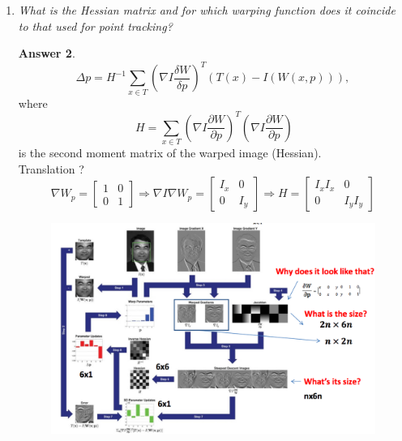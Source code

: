 \documentclass[a4paper,12 pt]{article}
\theoremstyle{definition}
\theoremstyle{remark}
\theoremstyle{definition}
\theoremstyle{definition}
\theoremstyle{definition}
\theoremstyle{definition}
\theoremstyle{remark}
\theoremstyle{remark}
\theoremstyle{definition}
\theoremstyle{definition}
\newtheorem*{answer}{Answer}
\begin{document}
\begin{enumerate}
\begin{enumerate}
\begin{answer}
\begin{equation}
I(W(x,p+\Delta p))\approx I(W(x,p))+ \underbrace{\nabla I}_{\text{image gradient}} \underbrace{\frac{\partial W}{\partial p}}_{\text{Jabobianof the warp}}\Delta p.
\end{equation}
The image gradient $\nabla l=[I_x,I_y]$ is evaluated at W(x,p). By replacing that in the equation we get
\begin{equation}
E=\sum_{x\in T}\left[ I(W(x,p))+ \nabla I \frac{\partial W}{\partial p}\Delta p-T(x)\right]^2.
\end{equation}
In order to minimize it, we differentiate and equate to 0, i.e.
\begin{equation}
\frac{\partial E}{\partial \Delta p}=0.
\end{equation}
\end{answer}
\item \textit{What is the Hessian matrix and for which warping function does it coincide to that used for point tracking?}
\begin{answer}
\begin{equation}
\Delta p=H^{-1}\sum_{x\in T}\left( \nabla I \frac{\delta W}{\delta p}\right)^T(T(x)-I(W(x,p))),
\end{equation}
where
\begin{equation}
\ H=\sum_{x\in T}\left( \nabla I \frac{\partial W}{\partial p}\right)^T \left( \nabla I \frac{\partial W}{\partial p}\right)
\end{equation}
is the second moment matrix of the warped image (Hessian).\\
Translation ?
\begin{equation}
\nabla W_p = \begin{bmatrix}
1 & 0 \\
0 & 1
\end{bmatrix} \Rightarrow
\nabla I \nabla W_p = \begin{bmatrix}
I_x & 0\\
0 &I_y
\end{bmatrix} \Rightarrow
H = \begin{bmatrix}
I_x I_x & 0 \\
0 & I_y I_y
\end{bmatrix}
\end{equation}
\begin{figure}[h!]
\begin{center}
\includegraphics[scale=0.3]{pics/KLT}

\end{center}
\end{figure}
\end{answer}
\end{enumerate}
\end{enumerate}
\end{document}
